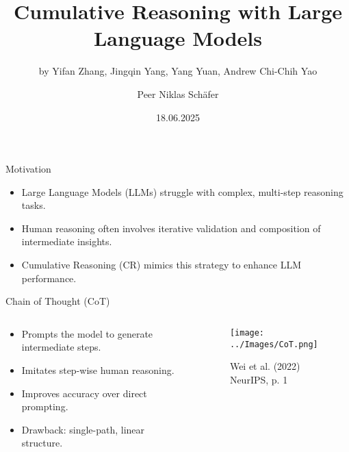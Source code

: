 \documentclass{beamer}
\title[]{Cumulative Reasoning with Large Language Models}
\subtitle{by Yifan Zhang, Jingqin Yang, Yang Yuan, Andrew Chi-Chih Yao}
\author{Peer Niklas Schäfer}
\institute{University of Cologne}
\date{18.06.2025}
\begin{document}
\begin{frame}
    \titlepage
\end{frame}


\begin{frame}{Motivation}
    \begin{itemize}
        \item Large Language Models (LLMs) struggle with complex, multi-step reasoning tasks.
        \item Human reasoning often involves iterative validation and composition of intermediate insights.
        \item Cumulative Reasoning (CR) mimics this strategy to enhance LLM performance.
    \end{itemize}
\end{frame}


\begin{frame}{Chain of Thought (CoT)}
    \begin{columns}
        \begin{column}{0.5\textwidth}
            \begin{itemize}
                \item Prompts the model to generate intermediate steps.
                \item Imitates step-wise human reasoning.
                \item Improves accuracy over direct prompting.
                \item Drawback: single-path, linear structure.
            \end{itemize}
        \end{column}
        \begin{column}{0.5\textwidth}
            \begin{figure}[htbp]
                \centering
                \texttt{[image: ../Images/CoT.png]}

                \vspace{0.5em}
                {\tiny Wei et al. (2022) NeurIPS, p. 1}
            \end{figure}
        \end{column}
    \end{columns}
\end{frame}

\end{document}
